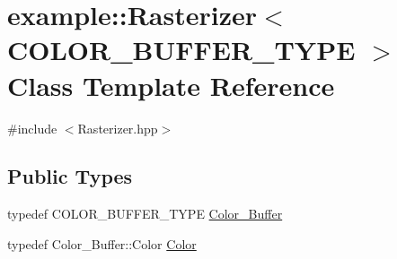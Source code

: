 \hypertarget{classexample_1_1_rasterizer}{}\section{example\+::Rasterizer$<$ C\+O\+L\+O\+R\+\_\+\+B\+U\+F\+F\+E\+R\+\_\+\+T\+Y\+PE $>$ Class Template Reference}
\label{classexample_1_1_rasterizer}


{\ttfamily \#include $<$Rasterizer.\+hpp$>$}

\subsection*{Public Types}
\begin{DoxyCompactItemize}
\item 
typedef C\+O\+L\+O\+R\+\_\+\+B\+U\+F\+F\+E\+R\+\_\+\+T\+Y\+PE \mbox{\hyperlink{classexample_1_1_rasterizer_a710beccb975a5f1aa771c44f784da525}{Color\+\_\+\+Buffer}}
\item 
typedef Color\+\_\+\+Buffer\+::\+Color \mbox{\hyperlink{classexample_1_1_rasterizer_aabfa22a5aef17d16a0cfb362fa30e69b}{Color}}
\end{DoxyCompactItemize}
